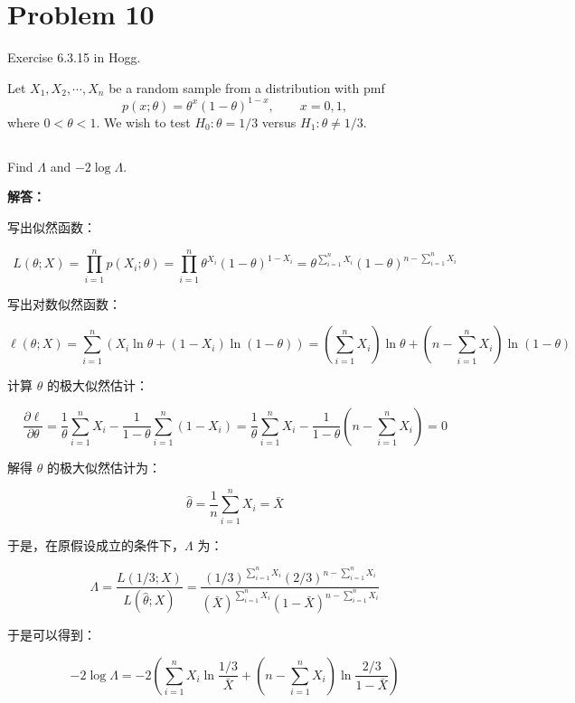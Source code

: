 \documentclass[12pt,a4paper]{article}
\begin{document}
\section{Problem 10}

Exercise 6.3.15 in Hogg.

Let $X_1,X_2,\cdots,X_n$ be a random sample from a distribution with pmf
\[
  p(x;\theta)=\theta^x(1-\theta)^{1-x},\qquad x=0,1,
\]
where $0<\theta<1$. We wish to test $H_0:\theta=1/3$ versus $H_1:\theta\ne 1/3$.

\subsection{}

Find $\Lambda$ and $-2\log\Lambda$.

\begin{answerbox}
\textbf{解答：}

写出似然函数：

$$
L(\theta; X) = \prod_{i=1}^n p(X_i; \theta) = \prod_{i=1}^n \theta^{X_i} (1-\theta)^{1-X_i} = \theta^{\sum_{i=1}^n X_i} (1-\theta)^{n - \sum_{i=1}^n X_i}
$$

写出对数似然函数：

$$
\ell(\theta; X) = \sum_{i=1}^n \left( X_i \ln \theta + (1 - X_i) \ln (1 - \theta) \right) = \left( \sum_{i=1}^n X_i \right) \ln \theta + \left( n - \sum_{i=1}^n X_i \right) \ln (1 - \theta)
$$

计算 $\theta$ 的极大似然估计：

$$
\frac{\partial \ell}{\partial \theta} = \frac{1}{\theta} \sum_{i=1}^n X_i - \frac{1}{1-\theta} \sum_{i=1}^n (1 - X_i) = \frac{1}{\theta} \sum_{i=1}^n X_i - \frac{1}{1-\theta} \left( n - \sum_{i=1}^n X_i \right) = 0
$$

解得 $\theta$ 的极大似然估计为：

$$
\hat{\theta} = \frac{1}{n} \sum_{i=1}^n X_i = \bar{X}
$$

于是，在原假设成立的条件下，$\Lambda$ 为：

$$
\Lambda = \frac{L(1/3; X)}{L(\hat{\theta}; X)} = \frac{(1/3)^{\sum_{i=1}^n X_i} (2/3)^{n - \sum_{i=1}^n X_i}}{(\bar{X})^{\sum_{i=1}^n X_i} (1-\bar{X})^{n - \sum_{i=1}^n X_i}}
$$

于是可以得到：

$$
-2\log \Lambda = -2 \left( \sum_{i=1}^n X_i \ln \frac{1/3}{\bar{X}} + \left( n - \sum_{i=1}^n X_i \right) \ln \frac{2/3}{1-\bar{X}} \right)
$$
\end{answerbox}
\end{document}
